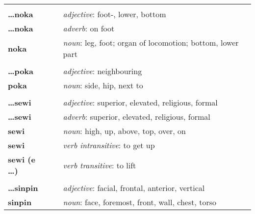 \begin{supertabular}{p{2,5cm}|ll}
                            &  &                                                                                   \\ %
    \textbf{\dots noka}     &  & \textit{adjective}: foot-, lower, bottom                                          \\  %
    \textbf{ \dots noka }   &  & \textit{adverb}: on foot                                                          \\  %
    \textbf{noka}           &  & \textit{noun}: leg, foot; organ of locomotion; bottom, lower part                 \\ %
                            &  &                                                                                   \\ %
    \textbf{\dots poka}     &  & \textit{adjective}: neighbouring                                                  \\ %
    \textbf{poka}           &  & \textit{noun}: side, hip, next to                                                 \\ %
                            &  &                                                                                   \\ %
    \textbf{\dots sewi}     &  & \textit{adjective}: superior, elevated, religious, formal                         \\ %
    \textbf{\dots sewi}     &  & \textit{adverb}: superior, elevated, religious, formal                            \\ %
    \textbf{sewi}           &  & \textit{noun}: high, up, above, top, over, on                                     \\ %
    \textbf{sewi}           &  & \textit{verb intransitive}: to get up                                             \\ %
    \textbf{sewi (e \dots)} &  & \textit{verb transitive}: to lift                                                 \\ %
                            &  &                                                                                   \\ %
    \textbf{\dots sinpin}   &  & \textit{adjective}: facial, frontal, anterior, vertical                           \\ %
    \textbf{sinpin}         &  & \textit{noun}: face, foremost, front, wall, chest, torso                          \\ %
\end{supertabular} \\
%
%
\newpage
%
